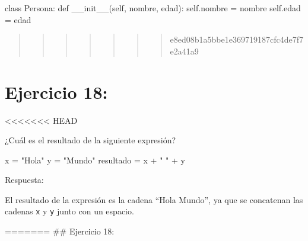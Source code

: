 \documentclass[
  a4paper,
  DIV=11,
  numbers=noendperiod,
  onepage,
  openany]{scrreprt}
\newenvironment{Shaded}{\begin{snugshade}}{\end{snugshade}}
\newcommand{\FunctionTok}[1]{\textcolor[rgb]{0.28,0.35,0.67}{#1}}
\newcommand{\KeywordTok}[1]{\textcolor[rgb]{0.00,0.23,0.31}{#1}}
\newcommand{\NormalTok}[1]{\textcolor[rgb]{0.00,0.23,0.31}{#1}}
\newcommand{\OperatorTok}[1]{\textcolor[rgb]{0.37,0.37,0.37}{#1}}
\newcommand{\StringTok}[1]{\textcolor[rgb]{0.13,0.47,0.30}{#1}}
\newcommand{\VariableTok}[1]{\textcolor[rgb]{0.07,0.07,0.07}{#1}}
\begin{document}
\begin{Shaded}
\begin{Highlighting}[]
\KeywordTok{class}\NormalTok{ Persona:}
    \KeywordTok{def} \FunctionTok{\_\_init\_\_}\NormalTok{(}\VariableTok{self}\NormalTok{, nombre, edad):}
        \VariableTok{self}\NormalTok{.nombre }\OperatorTok{=}\NormalTok{ nombre}
        \VariableTok{self}\NormalTok{.edad }\OperatorTok{=}\NormalTok{ edad}
\end{Highlighting}
\end{Shaded}

\begin{quote}
\begin{quote}
\begin{quote}
\begin{quote}
\begin{quote}
\begin{quote}
\begin{quote}
e8ed08b1a5bbe1e369719187cfc4de7f7e2a41a9
\end{quote}
\end{quote}
\end{quote}
\end{quote}
\end{quote}
\end{quote}
\end{quote}

\hypertarget{ejercicio-18}{%
\chapter{Ejercicio 18:}\label{ejercicio-18}}

\textless\textless\textless\textless\textless\textless\textless{} HEAD

¿Cuál es el resultado de la siguiente expresión?

\begin{Shaded}
\begin{Highlighting}[]
\NormalTok{x }\OperatorTok{=} \StringTok{"Hola"}
\NormalTok{y }\OperatorTok{=} \StringTok{"Mundo"}
\NormalTok{resultado }\OperatorTok{=}\NormalTok{ x }\OperatorTok{+} \StringTok{" "} \OperatorTok{+}\NormalTok{ y}
\end{Highlighting}
\end{Shaded}

Respuesta:

El resultado de la expresión es la cadena ``Hola Mundo'', ya que se
concatenan las cadenas \texttt{x} y \texttt{y} junto con un espacio.

======= \#\# Ejercicio 18:
\end{document}
